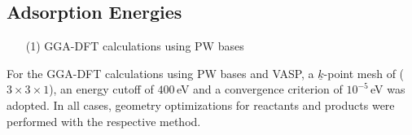 \documentclass[11pt,DIV=13,BCOR=5mm,a4paper,headinclude]{scrbook}
\renewcommand{\vec}[1]{\underline{#1}}
\begin{document}

\subsection{Adsorption Energies}\label{sec:eads_crystal}
\begin{enumerate}
 \item[(1)] GGA-DFT calculations using PW bases
\end{enumerate}
For the GGA-DFT calculations using PW bases and VASP, a $\vec{k}$-point mesh of ($3\times 3\times 1$), an energy cutoff of $400\,$eV and a convergence criterion of $10^{-5}\,$eV was adopted.
In all cases, geometry optimizations for reactants and products were performed with the respective method.
\end{document}
